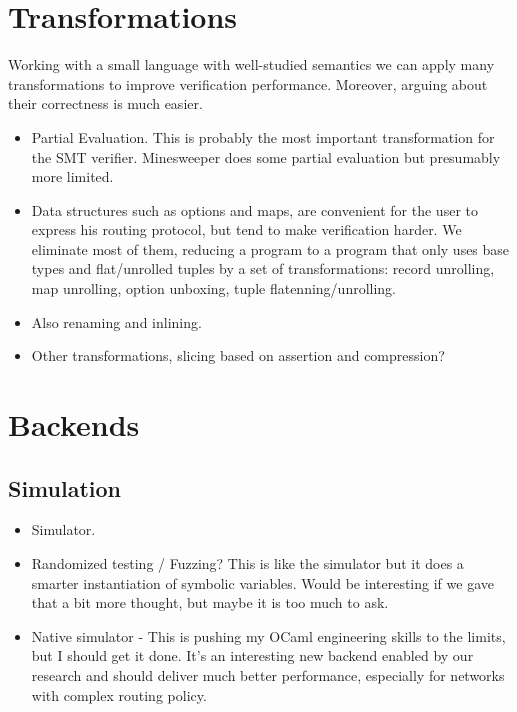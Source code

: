 \documentclass[sigconf,10pt]{acmart}
\begin{document}
%
%
%
%
\section{Transformations}
\label{sec:transformations}

Working with a small language with well-studied semantics we can apply many
transformations to improve verification performance. Moreover, arguing about their correctness is much easier.
\begin{itemize}
  \item Partial Evaluation. This is probably the most important transformation for the SMT verifier. Minesweeper does some partial evaluation but presumably more limited.
  \item Data structures such as options and maps, are convenient for the user to express his routing protocol, but tend to make verification harder. We eliminate most of them, reducing a program to a program that only uses base types and flat/unrolled tuples by a set of transformations: record unrolling, map unrolling, option unboxing, tuple flatenning/unrolling.
  \item Also renaming and inlining.
  \item Other transformations, slicing based on assertion and compression?
\end{itemize}



%
%
%
%

\section{Backends}
\label{sec:backends}

\subsection{Simulation}
\begin{itemize}
  \item Simulator.
  \item Randomized testing / Fuzzing? This is like the simulator but it does a smarter instantiation of symbolic variables. Would be interesting if we gave that a bit more thought, but maybe it is too much to ask.
  \item Native simulator - This is pushing my OCaml engineering skills to the limits, but I should get it done. It's an interesting new backend enabled by our research and should deliver much better performance, especially for networks with complex routing policy.
\end{itemize}
\end{document}
